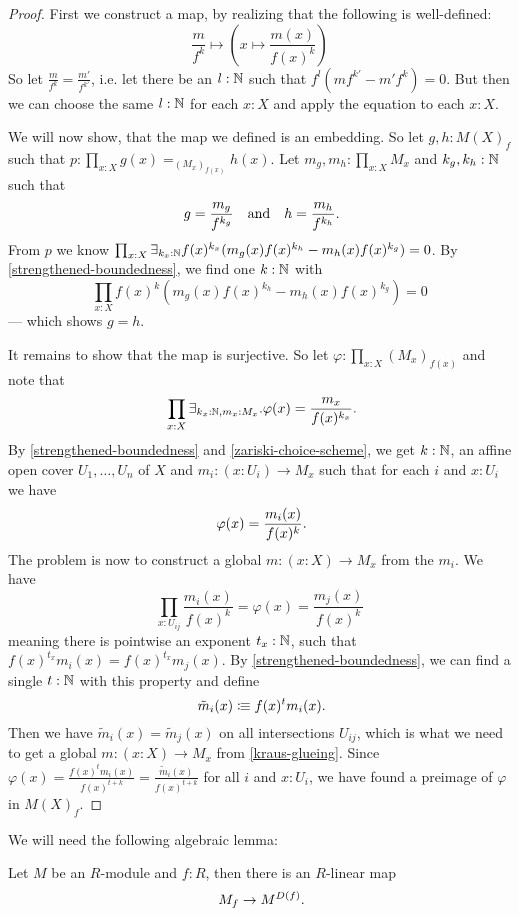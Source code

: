 \begin{proof}
First we construct a map, by realizing that the following is well-defined:
\[
  \frac{m}{f^k}\mapsto\left(x\mapsto \frac{m(x)}{f(x)^k}\right)
\]
So let $\frac{m}{f^k}=\frac{m'}{f^{k'}}$,
i.e. let there be an $l:\mathbb{N}$ such that $f^l(mf^{k'}-m'f^k)=0$.
But then we can choose the same $l:\mathbb{N}$ for each $x:X$
and apply the equation to each $x:X$.

We will now show, that the map we defined is an embedding.
So let $g,h:M(X)_f$ such that $p:\prod_{x:X}g(x)=_{(M_x)_{f(x)}}h(x)$.
Let $m_g,m_h:\prod_{x:X} M_x$ and $k_g,k_h:\mathbb{N}$ such that
\[
  g=\frac{m_g}{f^{k_g}} \quad\text{and}\quad h=\frac{m_h}{f^{k_h}}
  \rlap{.}
\]
From $p$ we know $\prod_{x:X}\exists_{k_x:\mathbb{N}}f(x)^{k_x}(m_g(x)f(x)^{k_h}-m_h(x)f(x)^{k_g})=0$.
By \cref{strengthened-boundedness},
we find one $k : \mathbb{N}$ with
\[
  \prod_{x:X}f(x)^{k}(m_g(x)f(x)^{k_h}-m_h(x)f(x)^{k_g})=0
\]
--- which shows $g=h$.

It remains to show that the map is surjective.
So let $\varphi:\prod_{x:X}(M_x)_{f(x)}$ and
note that
\[
  \prod_{x:X}
  \exists_{k_x:\N,m_x:M_x}.
  \varphi(x)=\frac{m_x}{f(x)^{k_x}}
  \rlap{.}
\]
By \cref{strengthened-boundedness} and \cref{zariski-choice-scheme},
we get $k:\mathbb{N}$, an affine open cover $U_1,\dots,U_n$ of $X$ and $m_i:(x : U_i)\to M_x$
such that for each $i$ and $x:U_i$ we have
\[
  \varphi(x)=\frac{m_i(x)}{f(x)^{k}}
  \rlap{.}
\]
The problem is now to construct a global $m:(x:X)\to M_x$ from the $m_i$.
We have
\[
    \prod_{x:U_{ij}}\frac{m_i(x)}{f(x)^k}=\varphi(x)=\frac{m_j(x)}{f(x)^k}
\]
meaning there is pointwise an exponent $t_x:\mathbb{N}$,
such that $f(x)^{t_x}m_i(x)=f(x)^{t_x}m_j(x)$.
By \cref{strengthened-boundedness},
we can find a single $t:\mathbb{N}$ with this property and define
\[
  \tilde{m}_i(x) \colonequiv f(x)^t m_i(x)
  \rlap{.}
\]
Then we have $\tilde{m}_i(x)=\tilde{m}_j(x)$ on all intersections $U_{ij}$,
which is what we need to get a global $m:(x:X)\to M_x$ from \cref{kraus-glueing}.
Since $\varphi(x)=\frac{f(x)^t m_i(x)}{f(x)^{t+k}}=\frac{\tilde{m}_i(x)}{f(x)^{t+k}}$
for all $i$ and $x : U_i$,
we have found a preimage of $\varphi$ in $M(X)_f$.
\end{proof}

We will need the following algebraic lemma:

\begin{lemma}%
  \label{localization-to-module-if-non-zero}
  Let $M$ be an $R$-module and $f:R$,
  then there is an $R$-linear map
  \[
    M_f\to M^{D(f)}
    \rlap{.}
  \]
\end{lemma}

